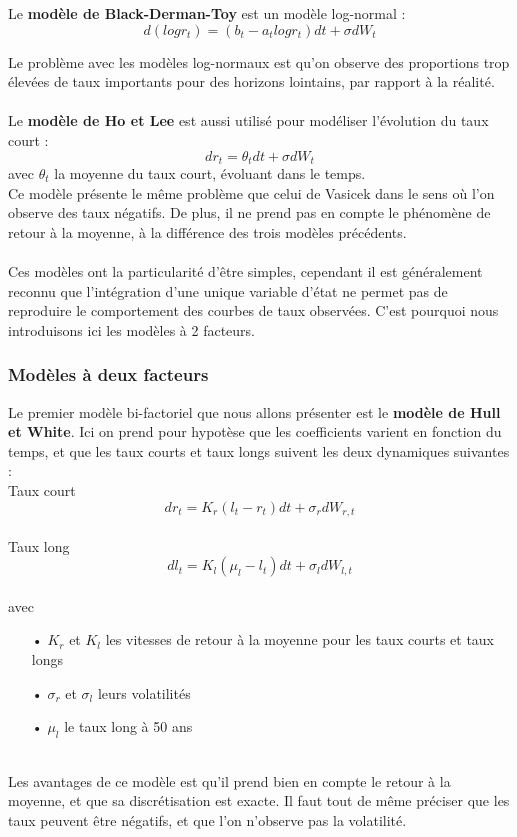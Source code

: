 \documentclass[french,12pt,a4paper]{article}
\begin{document}
Le \textbf{modèle de Black-Derman-Toy}  est un modèle log-normal :
$$ d(logr_{t}) = (b_{t} - a_{t} logr_{t})dt + \sigma dW_{t} $$

Le problème avec les modèles log-normaux est qu'on observe des proportions trop élevées de taux importants pour des horizons lointains, par rapport à la réalité.\\ \\

Le \textbf{modèle de Ho et Lee} est aussi utilisé pour modéliser l'évolution du taux court : \\
$$ dr_{t} = \theta_{t}dt + \sigma dW_{t} $$
avec $\theta_{t}$ la moyenne du taux court, évoluant dans le temps. \\
Ce modèle présente le même problème que celui de Vasicek dans le sens où l'on observe des taux négatifs. De plus, il ne prend pas en compte le phénomène de retour à la moyenne, à la différence des trois modèles précédents.\\ \\

Ces modèles ont la particularité d'être simples, cependant il est généralement reconnu que l'intégration d'une unique variable d'état ne permet pas de reproduire le comportement des courbes de taux observées. C'est pourquoi nous introduisons ici les modèles à 2 facteurs.


\subsubsection{Modèles à deux facteurs}
Le premier modèle bi-factoriel que nous allons présenter est le \textbf{modèle de Hull et White}. Ici on prend pour hypotèse que les coefficients varient en fonction du temps, et que les taux courts et taux longs suivent les deux dynamiques suivantes : \\
Taux court
$$ dr_{t} = K_{r}(l_{t} - r_{t})dt + \sigma_{r}dW_{r,t}  $$ \\
Taux long
$$ dl_{t} = K_{l}(\mu_{l} - l_{t})dt + \sigma_{l}dW_{l,t}  $$ \\
avec
\begin{itemize}
\item[•] $K_{r}$ et $K_{l}$ les vitesses de retour à la moyenne pour les taux courts et taux longs
\item[•] $\sigma_{r}$ et $\sigma_{l}$ leurs volatilités
\item[•] $\mu_{l}$ le taux long à 50 ans
\end{itemize}
\\
Les avantages de ce modèle est qu'il prend bien en compte le retour à la moyenne, et que sa discrétisation est exacte. Il faut tout de même préciser que les taux peuvent être négatifs, et que l'on n'observe pas la volatilité. \\ \\
\end{document}
